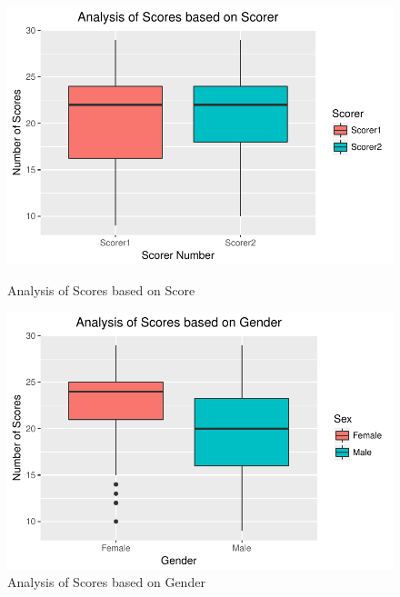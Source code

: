\documentclass[12pt,epsf]{report}
\begin{document}
\begin{figure}[!htb]
	\begin{minipage}[c]{0.5\linewidth}
	\includegraphics[width=\linewidth]{ScorerVsScore.pdf}
	\caption{Analysis of Scores based on Score }
	\end{minipage}
	\hfill
	\begin{minipage}[c]{0.5\linewidth}
	\includegraphics[width=\linewidth]{GenderVsScore.pdf}
	\caption{Analysis of Scores based on Gender}
	\end{minipage}
\end{figure}
\end{document}
